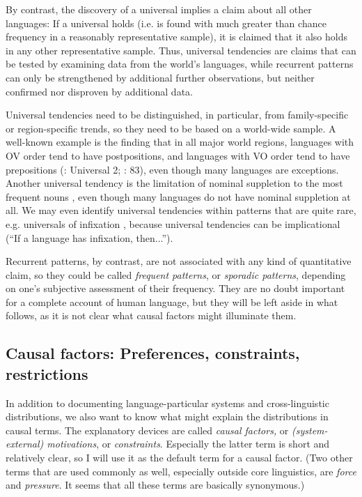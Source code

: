 \documentclass[output=paper]{langsci/langscibook}
\begin{document}
By contrast, the discovery of a universal implies a claim about all other languages: If a universal holds (i.e. is found with much greater than chance frequency in a reasonably representative sample), it is claimed that it also holds in any other representative sample. Thus, universal tendencies are claims that can be tested by examining data from the world’s languages, while recurrent patterns can only be strengthened by additional further observations, but neither confirmed nor disproven by additional data. 

Universal tendencies need to be distinguished, in particular, from family-specific or region-specific trends, so they need to be based on a world-wide sample. A well-known example is the finding that in all major world regions, languages with OV order tend to have postpositions, and languages with VO order tend to have prepositions (\citealt{Greenberg1963}: Universal 2; \citealt{Dryer1992}: 83), even though many languages are exceptions. Another universal tendency is the limitation of nominal suppletion to the most frequent nouns \citep{Vafaeian2013}, even though many languages do not have nominal suppletion at all. We may even identify universal tendencies within patterns that are quite rare, e.g. universals of infixation \citep{Yu2007}, because universal tendencies can be implicational (“If a language has infixation, then...”).

Recurrent patterns, by contrast, are not associated with any kind of quantitative claim, so they could be called \textit{frequent patterns}, or \textit{sporadic patterns}, depending on one’s subjective assessment of their frequency. They are no doubt important for a complete account of human language, but they will be left aside in what follows, as it is not clear what causal factors might illuminate them.

\subsection{Causal factors: Preferences, constraints, restrictions}\label{sec:haspelmath:2.3}


In addition to documenting language-particular systems and cross-linguistic distributions, we also want to know what might explain the distributions in causal terms. The explanatory devices are called \textit{causal factors,} or \textit{(system-external) motivations}, or \textit{constraints}. Especially the latter term is short and relatively clear, so I will use it as the default term for a causal factor. (Two other terms that are used commonly as well, especially outside core linguistics, are \textit{force} and \textit{pressure}. It seems that all these terms are basically synonymous.)
\end{document}
